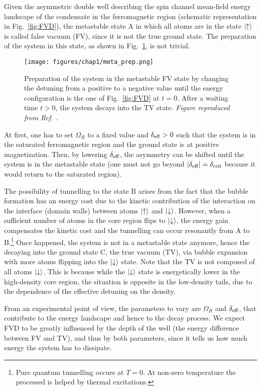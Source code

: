 Given the asymmetric double well describing the spin channel mean-field energy landscape of the condensate in the ferromagnetic region (schematic representation in Fig.\ \ref{fig:FVD}), the metastable state A in which all atoms are in the state $\ket{\uparrow}$ is called false vacuum (FV), since it is not the true ground state. The preparation of the system  in this state, as shown in Fig.\ \ref{fig:meta_prep}, is not trivial. 
\begin{figure}[ht!]
    \centering
    \texttt{[image: figures/chap1/meta\_prep.png]}
    \caption{Preparation of the system in the metastable FV state by changing the detuning from a positive to a negative value until the energy configuration is the one of Fig.\ \ref{fig:FVD} at $t = 0$. After a waiting time $t > 0$, the system decays into the TV state. \emph{Figure reproduced from Ref. \cite{zenesini2024false}}.}
    \label{fig:meta_prep}
\end{figure}
At first, one has to set $\Omega_R$ to a fixed value and $\delta_{\rm eff} > 0$ such that the system is in the saturated ferromagnetic region and the ground state is at positive magnetization. Then, by lowering $\delta_{\rm eff}$, the asymmetry can be shifted until the system is in the metastable state (one must not go beyond $|\delta_{\rm eff}| = \delta_{\rm crit}$ because it would return to the saturated region). 

The possibility of tunnelling to the state B arises from the fact that the bubble formation has an energy cost due to the kinetic contribution of the interaction on the interface (domain walls) between atoms $\ket{\uparrow}$ and $\ket{\downarrow}$. However, when a sufficient number of atoms in the core region flips to $\ket{\downarrow}$, the energy gain compensates the kinetic cost and the tunnelling can occur resonantly from A to B.\footnote{Pure quantum tunnelling occurs at $T = 0$. At non-zero temperature the processed is helped by thermal excitations.} Once happened, the system is not in a metastable state anymore, hence the decaying into the ground state C, the true vacuum (TV), via bubble expansion with more atoms flipping into the $\ket{\downarrow}$ state. Note that the TV is not composed of all atoms $\ket{\downarrow}$. This is because while the $\ket{\downarrow}$ state is energetically lower in the high-density core region, the situation is opposite in the low-density tails, due to the dependence of the effective detuning on the density.

From an experimental point of view, the parameters to vary are $\Omega_R$ and $\delta_{\rm eff}$, that contribute to the energy landscape and hence to the decay process. We expect FVD to be greatly influenced by the depth of the well (the energy difference between FV and TV), and thus by both parameters, since it tells us how much energy the system has to dissipate. 

